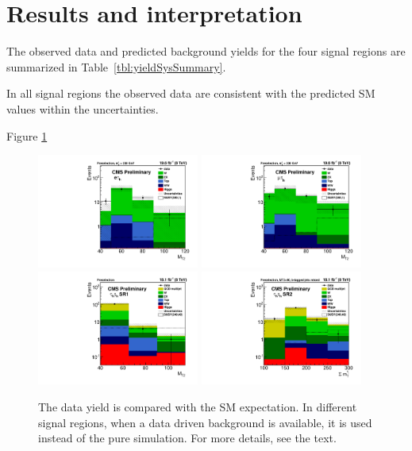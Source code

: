 \section{Results and interpretation}
\label{sect:stat}
The observed data and predicted background yields for the four signal regions are summarized in Table~\ref{tbl:yieldSysSummary}. 

In all signal regions the observed data  are consistent with the predicted SM values within the uncertainties. 

Figure \ref{fig:yield_final}
\begin{figure}[!htb]
\centering
\includegraphics[width=0.475\textwidth,keepaspectratio=true]{StatisticsFig/MT2_tauMTgt200_DDFakeEleTau.pdf}
\includegraphics[width=0.475\textwidth,keepaspectratio=true]{StatisticsFig/MT2muTau_tauMTgt200_DDFake.pdf}
\includegraphics[width=0.475\textwidth,keepaspectratio=true]{StatisticsFig/QCDWestimation_bin1.pdf}
\includegraphics[width=0.475\textwidth,keepaspectratio=true]{StatisticsFig/QCDWestimation_bin2.pdf}
\caption{The data yield is compared with the SM expectation. In different signal regions, 
when a data driven background is available, it is used instead of the pure simulation. For more details, see the text.}
\label{fig:yield_final}
\end{figure}
